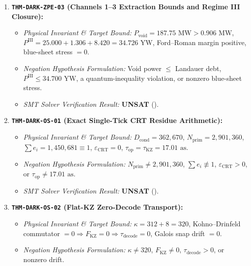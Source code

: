 \documentclass[11pt,onecolumn]{article}
\begin{document}
\begin{enumerate}
\begin{itemize}
        \item \emph{Negation Hypothesis Formulation:} $\Delta_{\text{fr}}\neq0$ while $E_{\mu\nu}=0$ or the fault remains unlatched.
        \item \emph{SMT Solver Verification Result:} \textbf{UNSAT} ().
    \end{itemize}
    \item \textbf{\texttt{THM-DARK-ZPE-03} (Channels 1--3 Extraction Bounds and Regime III Closure):}
    \begin{itemize}
        \item \emph{Physical Invariant \& Target Bound:} $P_{\text{void}}=187.75\text{ MW}>0.906\text{ MW}$, $P^{\text{III}}=25.000+1.306+8.420=34.726\text{ YW}$, Ford--Roman margin positive, blue-sheet stress $=0$.
        \item \emph{Negation Hypothesis Formulation:} Void power $\le$ Landauer debt, $P^{\text{III}}\le34.700\text{ YW}$, a quantum-inequality violation, or nonzero blue-sheet stress.
        \item \emph{SMT Solver Verification Result:} \textbf{UNSAT} ().
    \end{itemize}
    \item \textbf{\texttt{THM-DARK-OS-01} (Exact Single-Tick CRT Residue Arithmetic):}
    \begin{itemize}
        \item \emph{Physical Invariant \& Target Bound:} $D_{\text{cond}}=362{,}670$, $N_{\text{prim}}=2{,}901{,}360$, $\sum e_i=1{,}450{,}681\equiv1$, $\varepsilon_{\text{CRT}}=0$, $\tau_{\text{op}}=\tau_{\text{KZ}}=17.01\text{ as}$.
        \item \emph{Negation Hypothesis Formulation:} $N_{\text{prim}}\neq2{,}901{,}360$, $\sum e_i\not\equiv1$, $\varepsilon_{\text{CRT}}>0$, or $\tau_{\text{op}}\neq17.01\text{ as}$.
        \item \emph{SMT Solver Verification Result:} \textbf{UNSAT} ().
    \end{itemize}
    \item \textbf{\texttt{THM-DARK-OS-02} (Flat-KZ Zero-Decode Transport):}
    \begin{itemize}
        \item \emph{Physical Invariant \& Target Bound:} $\kappa=312+8=320$, Kohno--Drinfeld commutator $=0\Rightarrow F_{\text{KZ}}=0\Rightarrow\tau_{\text{decode}}=0$, Galois snap drift $=0$.
        \item \emph{Negation Hypothesis Formulation:} $\kappa\neq320$, $F_{\text{KZ}}\neq0$, $\tau_{\text{decode}}>0$, or nonzero drift.

\end{itemize}
\end{enumerate}
\end{document}
